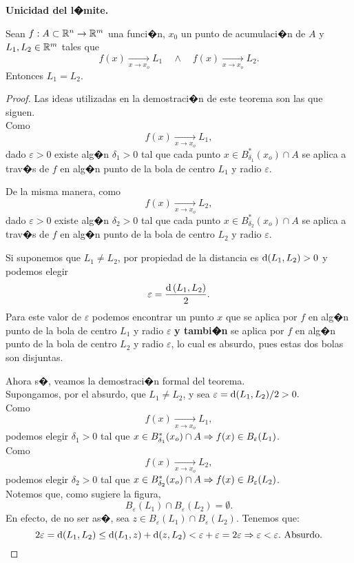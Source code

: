 \documentclass[a4paper]{scrartcl} %
\begin{document}
\begin{theorem}\textbf{Unicidad del l�mite.} \label{teo:unicidad_limite}
\mbox{}

Sean $f:A \subset \mathbb{R}^n \to \mathbb{R}^m$ una funci�n, $x_0$ un punto de acumulaci�n de $A$ y $L_1, L_2 \in \mathbb{R}^m$ tales que 
\[
 f(x) \xrightarrow[x \to x_o]{} L_1 \quad \wedge \quad f(x) \xrightarrow[x \to x_o]{} L_2.
\]
Entonces $L_1 = L_2$.
\begin{proof}
\mbox{}

Las ideas utilizadas en la demostraci�n de este teorema son las que siguen.\\
Como 
\[
 f(x) \xrightarrow[x \to x_o]{} L_1,
\]
dado $\varepsilon > 0$ existe alg�n $\delta_1 > 0$ tal que cada punto $x \in B_{\delta_1}^*(x_o) \cap A$ se aplica a trav�s de $f$ en alg�n punto de la bola de centro $L_1$ y radio $\varepsilon$.

\def\Ro{2.0}
\def\Rb{1.0}
\def\Ra{3.0}
\def\sep{1.0*\Ro}




De la misma manera, como 
\[
 f(x) \xrightarrow[x \to x_o]{} L_2,
\]
dado $\varepsilon > 0$ existe alg�n $\delta_2 > 0$ tal que cada punto $x \in B_{\delta_2}^*(x_o) \cap A$ se aplica a trav�s de $f$ en alg�n punto de la bola de centro $L_2$ y radio $\varepsilon$.




Si suponemos que $L_1 \ne L_2$, por propiedad de la distancia es $\operatorname{d}(L_1,L_2) > 0$ y podemos elegir 
\[
 \varepsilon = \frac{\operatorname{d}{(L_1,L_2)}}{2}.
\]
Para este valor de $\varepsilon$ podemos encontrar un punto $x$ que se aplica por $f$ en alg�n punto de la bola de centro $L_1$ y radio $\varepsilon$ \textbf{y tambi�n} se aplica por $f$ en alg�n punto de la bola de centro $L_2$ y radio $\varepsilon$, lo cual es absurdo, pues estas dos bolas son disjuntas.



Ahora s�, veamos la demostraci�n formal del teorema.\\
 Supongamos, por el absurdo, que $L_1 \ne L_2$, y sea $\varepsilon = \operatorname{d}(L_1,L_2)/2 > 0.$ \\ 
 Como 
 \[
  f(x) \xrightarrow[x \to x_o]{} L_1,
 \]
podemos elegir $\delta_1 > 0$ tal que $x \in B_{\delta_1}^*(x_o) \cap A \Rightarrow f(x) \in B_{\varepsilon}(L_1)$.\\
Como 
\[
 f(x) \xrightarrow[x \to x_o]{} L_2,
\]
 podemos elegir $\delta_2 > 0$ tal que $x \in B_{\delta_2}^*(x_o) \cap A \Rightarrow f(x) \in B_{\varepsilon}(L_2)$.\\
 Notemos que, como sugiere la figura, 
 \[
  B_{\varepsilon}(L_1) \cap B_{\varepsilon}(L_2) = \emptyset.
 \]
 En efecto, de no ser as�, sea $z \in B_{\varepsilon}(L_1) \cap B_{\varepsilon}(L_2)$. Tenemos que:
 \[
  2 \varepsilon = \operatorname{d}(L_1,L_2) \le \operatorname{d}(L_1,z) + \operatorname{d}(z,L_2)
  < \varepsilon + \varepsilon = 2 \varepsilon \Rightarrow \varepsilon < \varepsilon. \text{ Absurdo.}
 \]


\end{proof}
\end{theorem}
\end{document}
